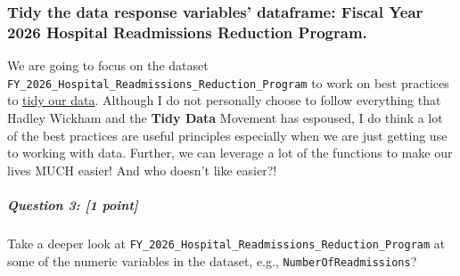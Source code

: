 \documentclass[
]{article}
\begin{document}
\subsubsection{Tidy the data response variables' dataframe: Fiscal Year
2026 Hospital Readmissions Reduction
Program.}\label{tidy-the-data-response-variables-dataframe-fiscal-year-2026-hospital-readmissions-reduction-program.}

We are going to focus on the dataset
\texttt{FY\_2026\_Hospital\_Readmissions\_Reduction\_Program} to work on
best practices to
\href{https://vita.had.co.nz/papers/tidy-data.pdf}{tidy our data}.
Although I do not personally choose to follow everything that Hadley
Wickham and the \textbf{Tidy Data} Movement has espoused, I do think a
lot of the best practices are useful principles especially when we are
just getting use to working with data. Further, we can leverage a lot of
the functions to make our lives MUCH easier! And who doesn't like
easier?!

\subparagraph{\texorpdfstring{\textbf{Question 3}: {[}1
point{]}}{Question 3: {[}1 point{]}}}\label{question-3-1-point}

Take a deeper look at
\texttt{FY\_2026\_Hospital\_Readmissions\_Reduction\_Program} at some of
the numeric variables in the dataset, e.g.,
\texttt{NumberOfReadmissions}?
\end{document}
